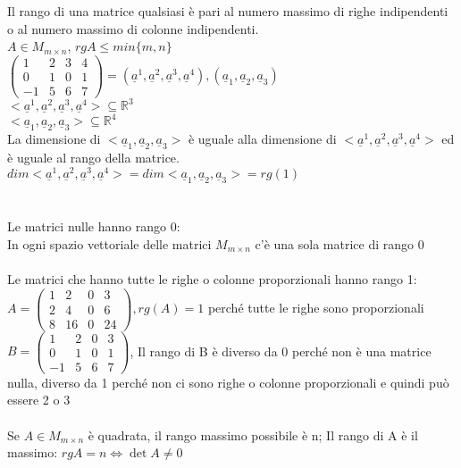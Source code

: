 Il rango di una matrice qualsiasi è pari al numero massimo di righe indipendenti o al numero massimo di colonne indipendenti.\\
$A\in M_{m\times n}$, $rgA\leqslant min\{m,n\}$\\
$\begin{pmatrix}
	1 & 2 & 3 & 4\\
	0 & 1 & 0 & 1\\
	-1 & 5 & 6 & 7
\end{pmatrix}=(\underline{a}^1, \underline{a}^2, \underline{a}^3, \underline{a}^4), (\underline{a}_1,\underline{a}_2,\underline{a}_3)$\\
$<\underline{a}^1, \underline{a}^2, \underline{a}^3, \underline{a}^4>\subseteq\mathbb{R}^3$\\
$<\underline{a}_1,\underline{a}_2,\underline{a}_3>\subseteq\mathbb{R}^4$\\
La dimensione di $<\underline{a}_1,\underline{a}_2,\underline{a}_3>$ è uguale alla dimensione di $<\underline{a}^1, \underline{a}^2, \underline{a}^3, \underline{a}^4>$ ed è uguale al rango della matrice.\\
$dim<\underline{a}^1, \underline{a}^2, \underline{a}^3, \underline{a}^4>=dim<\underline{a}_1,\underline{a}_2,\underline{a}_3>=rg(1)$\\\\\\
Le matrici nulle hanno rango 0:\\
In ogni spazio vettoriale delle matrici $M_{m\times n}$ c'è una sola matrice di rango 0\\\\
Le matrici che hanno tutte le righe o colonne proporzionali hanno rango 1:
$A=\begin{pmatrix}
	1 & 2 & 0 & 3\\
	2 & 4 & 0 & 6\\
	8 & 16 & 0 & 24
\end{pmatrix}, rg(A)=1$ perché tutte le righe sono proporzionali\\
$B=\begin{pmatrix}
	1 & 2 & 0 & 3\\
	0 & 1 & 0 & 1\\
	-1 & 5 & 6 & 7
\end{pmatrix}$, Il rango di B è diverso da 0 perché non è una matrice nulla, diverso da 1 perché non ci sono righe o colonne proporzionali e quindi può essere 2 o 3\\\\
Se $A\in M_{m\times n}$ è quadrata, il rango massimo possibile è n; Il rango di A è il massimo: $rgA=n\Leftrightarrow \det A\neq 0$
